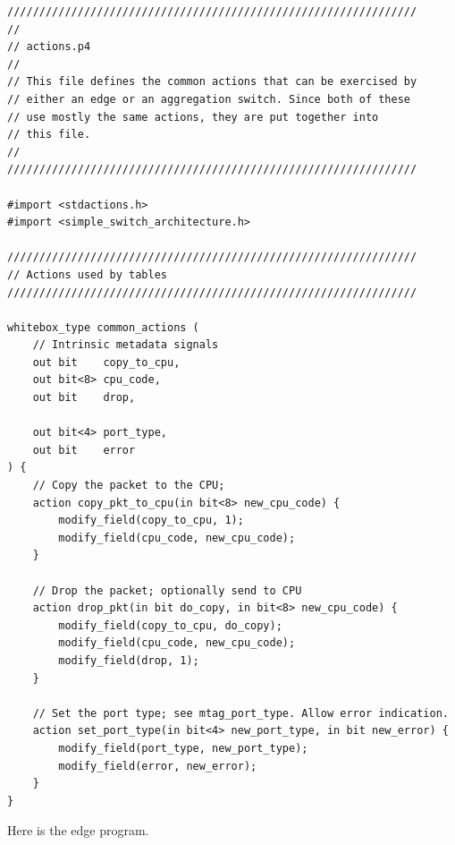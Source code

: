 \documentclass[12pt]{article}
\begin{document}
\begin{lstlisting}[style=P4style]
////////////////////////////////////////////////////////////////
//
// actions.p4
//
// This file defines the common actions that can be exercised by
// either an edge or an aggregation switch. Since both of these
// use mostly the same actions, they are put together into 
// this file.
//
////////////////////////////////////////////////////////////////

#import <stdactions.h>
#import <simple_switch_architecture.h>

////////////////////////////////////////////////////////////////
// Actions used by tables
////////////////////////////////////////////////////////////////

whitebox_type common_actions (
    // Intrinsic metadata signals
    out bit    copy_to_cpu,
    out bit<8> cpu_code,
    out bit    drop,

    out bit<4> port_type,
    out bit    error
) {
    // Copy the packet to the CPU;
    action copy_pkt_to_cpu(in bit<8> new_cpu_code) {
        modify_field(copy_to_cpu, 1);
        modify_field(cpu_code, new_cpu_code);
    }

    // Drop the packet; optionally send to CPU
    action drop_pkt(in bit do_copy, in bit<8> new_cpu_code) {
        modify_field(copy_to_cpu, do_copy);
        modify_field(cpu_code, new_cpu_code);
        modify_field(drop, 1);
    }

    // Set the port type; see mtag_port_type. Allow error indication.
    action set_port_type(in bit<4> new_port_type, in bit new_error) {
        modify_field(port_type, new_port_type);
        modify_field(error, new_error);
    }    
}

\end{lstlisting}

Here is the edge program.
\end{document}
